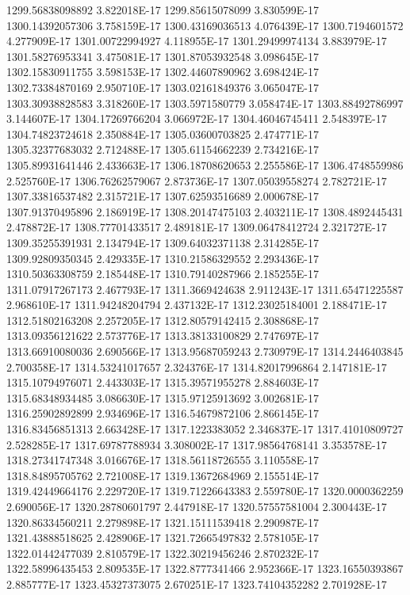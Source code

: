 1299.56838098892  3.822018E-17
1299.85615078099  3.830599E-17
1300.14392057306  3.758159E-17
1300.43169036513  4.076439E-17
1300.7194601572  4.277909E-17
1301.00722994927  4.118955E-17
1301.29499974134  3.883979E-17
1301.58276953341  3.475081E-17
1301.87053932548  3.098645E-17
1302.15830911755  3.598153E-17
1302.44607890962  3.698424E-17
1302.73384870169  2.950710E-17
1303.02161849376  3.065047E-17
1303.30938828583  3.318260E-17
1303.5971580779  3.058474E-17
1303.88492786997  3.144607E-17
1304.17269766204  3.066972E-17
1304.46046745411  2.548397E-17
1304.74823724618  2.350884E-17
1305.03600703825  2.474771E-17
1305.32377683032  2.712488E-17
1305.61154662239  2.734216E-17
1305.89931641446  2.433663E-17
1306.18708620653  2.255586E-17
1306.4748559986  2.525760E-17
1306.76262579067  2.873736E-17
1307.05039558274  2.782721E-17
1307.33816537482  2.315721E-17
1307.62593516689  2.000678E-17
1307.91370495896  2.186919E-17
1308.20147475103  2.403211E-17
1308.4892445431  2.478872E-17
1308.77701433517  2.489181E-17
1309.06478412724  2.321727E-17
1309.35255391931  2.134794E-17
1309.64032371138  2.314285E-17
1309.92809350345  2.429335E-17
1310.21586329552  2.293436E-17
1310.50363308759  2.185448E-17
1310.79140287966  2.185255E-17
1311.07917267173  2.467793E-17
1311.3669424638  2.911243E-17
1311.65471225587  2.968610E-17
1311.94248204794  2.437132E-17
1312.23025184001  2.188471E-17
1312.51802163208  2.257205E-17
1312.80579142415  2.308868E-17
1313.09356121622  2.573776E-17
1313.38133100829  2.747697E-17
1313.66910080036  2.690566E-17
1313.95687059243  2.730979E-17
1314.2446403845  2.700358E-17
1314.53241017657  2.324376E-17
1314.82017996864  2.147181E-17
1315.10794976071  2.443303E-17
1315.39571955278  2.884603E-17
1315.68348934485  3.086630E-17
1315.97125913692  3.002681E-17
1316.25902892899  2.934696E-17
1316.54679872106  2.866145E-17
1316.83456851313  2.663428E-17
1317.1223383052  2.346837E-17
1317.41010809727  2.528285E-17
1317.69787788934  3.308002E-17
1317.98564768141  3.353578E-17
1318.27341747348  3.016676E-17
1318.56118726555  3.110558E-17
1318.84895705762  2.721008E-17
1319.13672684969  2.155514E-17
1319.42449664176  2.229720E-17
1319.71226643383  2.559780E-17
1320.0000362259  2.690056E-17
1320.28780601797  2.447918E-17
1320.57557581004  2.300443E-17
1320.86334560211  2.279898E-17
1321.15111539418  2.290987E-17
1321.43888518625  2.428906E-17
1321.72665497832  2.578105E-17
1322.01442477039  2.810579E-17
1322.30219456246  2.870232E-17
1322.58996435453  2.809535E-17
1322.8777341466  2.952366E-17
1323.16550393867  2.885777E-17
1323.45327373075  2.670251E-17
1323.74104352282  2.701928E-17
